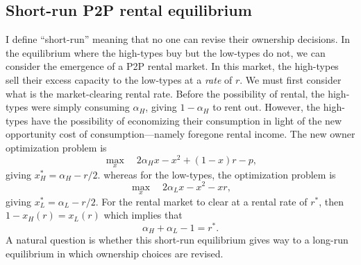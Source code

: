 \documentclass[11pt]{article}
\begin{document}
\subsection{Short-run P2P rental equilibrium} 
I define ``short-run'' meaning that no one can revise their ownership decisions. 
In the equilibrium where the high-types buy but the low-types do not, we can consider the emergence of a P2P rental market. 
In this market, the high-types sell their excess capacity to the low-types at a \emph{rate} of $r$. 
We must first consider what is the market-clearing rental rate. 
Before the possibility of rental, the high-types were simply consuming $\alpha_H$, giving $1-\alpha_H$ to rent out.
However, the high-types have the possibility of economizing their consumption in light of the new opportunity cost of consumption---namely foregone rental income. 
The new owner optimization problem is 
\begin{equation}
\max_x \quad 2\alpha_H x - x^2 + (1-x)r - p,   
\end{equation} 
giving $x_H^* = \alpha_H - r/2$. 
whereas for the low-types, the optimization problem is 
\begin{equation}
\max_x \quad 2 \alpha_L x - x^2 - xr,  
\end{equation} 
giving $x_L^* = \alpha_L - r/2$. 
For the rental market to clear at a rental rate of $r^*$, then $1 - x_H(r) = x_L(r)$  
which implies that 
\begin{equation} \label{eq:strr} 
\alpha_H + \alpha_L - 1 = r^*.  
\end{equation} 
A natural question is whether this short-run equilibrium gives way to a long-run equilibrium in which ownership choices are revised. 
\end{document}
